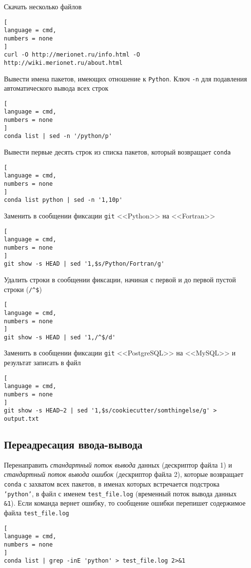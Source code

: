 \documentclass[%
	11pt,
	a4paper,
	utf8,
		]{article}
\begin{document}
Скачать несколько файлов 
\begin{lstlisting}[
language = cmd,
numbers = none
]
curl -O http://merionet.ru/info.html -O http://wiki.merionet.ru/about.html
\end{lstlisting}

Вывести имена пакетов, имеющих отношение к \texttt{Python}. Ключ \verb|-n| для подавления автоматического вывода всех строк
\begin{lstlisting}[
language = cmd,
numbers = none
]
conda list | sed -n '/python/p' 
\end{lstlisting}

Вывести первые десять строк из списка пакетов, который возвращает \texttt{conda}
\begin{lstlisting}[
language = cmd,
numbers = none
]
conda list python | sed -n '1,10p'
\end{lstlisting}

Заменить в сообщении фиксации \texttt{git} <<Python>> на <<Fortran>>
\begin{lstlisting}[
language = cmd,
numbers = none
]
git show -s HEAD | sed '1,$s/Python/Fortran/g'
\end{lstlisting}

Удалить строки в сообщении фиксации, начиная с первой и до первой пустой строки (\verb|/^$|)
\begin{lstlisting}[
language = cmd,
numbers = none
]
git show -s HEAD | sed '1,/^$/d'
\end{lstlisting}

Заменить в сообщении фиксации \texttt{git} <<PostgreSQL>> на <<MySQL>> и результат записать в файл
\begin{lstlisting}[
language = cmd,
numbers = none
]
git show -s HEAD~2 | sed '1,$s/cookiecutter/somthingelse/g' > output.txt
\end{lstlisting}




\subsection{Переадресация ввода-вывода}

Перенаправить \emph{стандартный поток вывода} данных (дескриптор файла 1) и \emph{стандартный поток вывода ошибок} (дескриптор файла 2), которые возвращает \texttt{conda} с захватом всех пакетов, в именах которых встречается подстрока \texttt{'python'}, в файл с именем \texttt{test\_file.log} (временный поток вывода данных \texttt{\&1}). Если команда вернет ошибку, то сообщение ошибки перепишет содержимое файла \texttt{test\_file.log}
\begin{lstlisting}[
language = cmd,
numbers = none
]
conda list | grep -inE 'python' > test_file.log 2>&1
\end{lstlisting}
\end{document}

